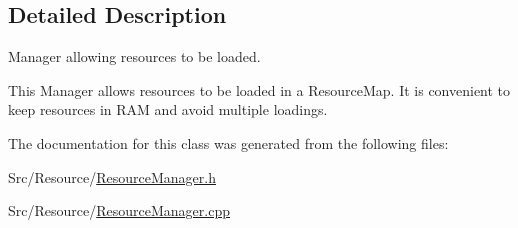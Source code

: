 \subsection{Detailed Description}
Manager allowing resources to be loaded. 

This Manager allows resources to be loaded in a Resource\-Map. It is convenient to keep resources in R\-A\-M and avoid multiple loadings. 

The documentation for this class was generated from the following files\-:\begin{DoxyCompactItemize}
\item 
Src/\-Resource/\hyperlink{ResourceManager_8h}{Resource\-Manager.\-h}\item 
Src/\-Resource/\hyperlink{ResourceManager_8cpp}{Resource\-Manager.\-cpp}\end{DoxyCompactItemize}
